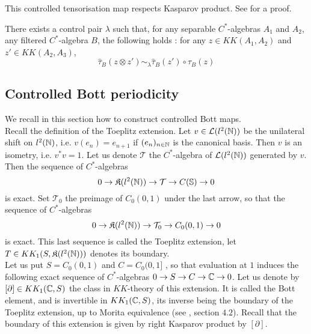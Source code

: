 This controlled tensorisation map respects Kasparov product. See \cite{OY2} for a proof.

\begin{thm}
There exists a control pair $\lambda$ such that, for any separable $C^*$-algebras $A_1$ and $A_2$, any filtered $C^*$-algebra $B$, the following holds : for any $z\in KK(A_1,A_2)$ and $z'\in KK(A_2,A_3)$,
\[\hat\tau_B(z\otimes z')\sim_\lambda \hat\tau_B(z')\circ\hat\tau_B(z)\]
\end{thm}



\subsection{Controlled Bott periodicity}

We recall in this section how to construct controlled Bott maps. \\

Recall the definition of the Toeplitz extension. Let $v\in \mathcal L(l^2(\mathbb N))$ be the unilateral shift on $l^2(\mathbb N)$, i.e. $v(e_n) = e_{n+1}$ if $(e_n)_{n\in \mathbb N}$ is the canonical basis. Then $v$ is an isometry, i.e. $v^*v = 1$. Let us denote $\mathcal T $ the $C^*$-algebra of $\mathcal L(l^2(\mathbb N))$ generated by $v$. Then the sequence of $C^*$-algebras 
\[0\rightarrow \mathfrak K(l^2(\mathbb N)) \rightarrow \mathcal T \rightarrow C(\mathbb S) \rightarrow 0 \]
is exact. Set $\mathcal T_0$ the preimage of $C_0(0,1)$ under the last arrow, so that the sequence of $C^*$-algebras
\[0\rightarrow \mathfrak K(l^2(\mathbb N)) \rightarrow \mathcal T_0 \rightarrow C_0(0,1) \rightarrow 0 \]
is exact. This last sequence is called the Toeplitz extension, let $T\in KK_1(S, \mathfrak K(l^2(\mathbb N)) )$ denotes its boundary.\\

Let us put $S = C_0(0,1)$ and $C= C_0(0,1]$ , so that evaluation at $1$ induces the following exact sequence of $C^*$-algebras $0\rightarrow S \rightarrow C \rightarrow \mathbb C \rightarrow  0 $. Let us denote by $[\partial]\in KK_1(\mathbb C,S)$ the class in $KK$-theory of this extension. It is called the Bott element, and is invertible in $KK_1(\mathbb C,S)$, its inverse being the boundary of the Toeplitz extension, up to Morita equivalence (see \cite{OY2}, section $4.2$). Recall that the boundary of this extension is given by right Kasparov product by $[\partial]$.\\ 

